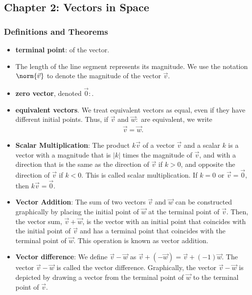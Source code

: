 \documentclass{report}
\begin{document}
    \pagebreak 
    \subsection{Chapter 2: Vectors in Space}

    \bigbreak \noindent 
    \subsubsection{Definitions and Theorems}
    \begin{itemize}
        \item \textbf{terminal point}: of the vector.
        \item The length of the line segment represents its magnitude. We use the notation  $\norm{\vec{v}}$ to denote the magnitude of the vector  $\vec{v}$.
        \item \textbf{zero vector}, denoted $\vec{0}:$.
        \item \textbf{equivalent vectors}. We treat equivalent vectors as equal, even if they have different initial points. Thus, if  $\vec{v}$ and  $\vec{w}:$ are equivalent, we write
      \begin{align*}
         \vec{v} = \vec{w} 
      .\end{align*}
  \item \textbf{Scalar Multiplication}:
      The product $k\vec{v}$ of a vector $\vec{v}$ and a scalar $k$ is a vector with a magnitude that is $|k|$ times the magnitude of $\vec{v}$, and with a direction that is the same as the direction of $\vec{v}$ if $k > 0$, and opposite the direction of $\vec{v}$ if $k < 0$. This is called scalar multiplication. If $k = 0$ or $\vec{v} = \vec{0}$, then $k\vec{v} = \vec{0}$.
    \item \textbf{Vector Addition}: 
        The sum of two vectors $\vec{v}$ and $\vec{w}$ can be constructed graphically by placing the initial point of $\vec{w}$ at the terminal point of $\vec{v}$. Then, the vector sum, $\vec{v} + \vec{w}$, is the vector with an initial point that coincides with the initial point of $\vec{v}$ and has a terminal point that coincides with the terminal point of $\vec{w}$. This operation is known as vector addition.
        \bigbreak \noindent 
    \item \textbf{Vector difference}: 
        We define $\vec{v} - \vec{w}$ as $\vec{v} + (-\vec{w}) = \vec{v} + (-1)\vec{w}$. The vector $\vec{v} - \vec{w}$ is called the vector difference. Graphically, the vector $\vec{v} - \vec{w}$ is depicted by drawing a vector from the terminal point of $\vec{w}$ to the terminal point of $\vec{v}$.

\end{itemize}
\end{document}
